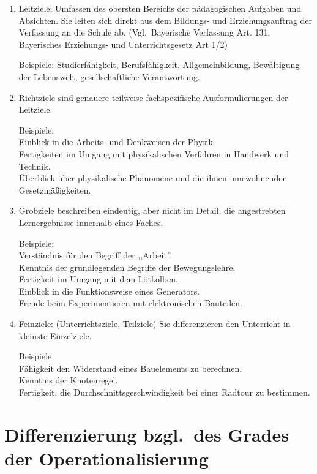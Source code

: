 \begin{enumerate}
\item
Leitziele: Umfassen des obersten Bereichs der p\"{a}dagogischen
Aufgaben und Absichten.
Sie leiten sich direkt aus dem Bildungs- und Erziehungsauftrag
der Verfassung an die Schule ab.
(Vgl.\ Bayerische Verfassung Art. 131, Bayerisches
Erziehungs- und Unterrichtsgesetz Art 1/2)

\mip
Beispiele: Studierf\"{a}higkeit, Berufsf\"{a}higkeit, Allgemeinbildung,
Bew\"{a}ltigung der
Lebenswelt, gesellschaftliche Verantwortung.

\item
Richtziele sind genauere teilweise fachspezifische
Ausformulierungen der Leitziele.

\mip
Beispiele: \\
Einblick in die Arbeits- und Denkweisen der Physik \\
Fertigkeiten im Umgang mit physikalischen Verfahren in Handwerk
und Technik. \\
\"{U}berblick \"{u}ber physikalische Ph\"{a}nomene und die ihnen
innewohnenden Gesetzm\"{a}{\ss}igkeiten.

\item
Grobziele beschreiben eindeutig, aber nicht im Detail,
die angestrebten Lernergebnisse innerhalb eines Faches.

\mip
Beispiele: \\
Verst\"{a}ndnis f\"{u}r den Begriff der ,,Arbeit''. \\
Kenntnis der grundlegenden Begriffe der Bewegungslehre. \\
Fertigkeit im Umgang mit dem L\"{o}tkolben. \\
Einblick in die Funktionsweise eines Generators. \\
Freude beim Experimentieren mit elektronischen Bauteilen.

\item
Feinziele: (Unterrichtsziele, Teilziele)
Sie differenzieren den Unterricht in kleinste Einzelziele.

\mip
Beispiele \\
F\"{a}higkeit den Widerstand eines Bauelements zu berechnen. \\
Kenntnis der Knotenregel. \\
Fertigkeit, die Durchschnittsgeschwindigkeit bei einer Radtour
zu bestimmen.
\end{enumerate}

\bip\bip
\section{Differenzierung bzgl.\ des Grades der Operationalisierung}


